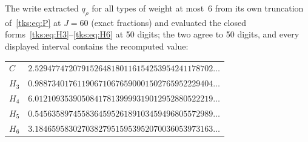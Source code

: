 \begin{writenote}
The write extracted $q_\rho$ for all types of weight at most~6 from its own
truncation of~\eqref{tks:eq:P} at $J=60$ (exact fractions) and evaluated the
closed forms~\eqref{tks:eq:H3}--\eqref{tks:eq:H6} at 50 digits; the two agree
to 50 digits, and every displayed interval contains the recomputed value:
\begin{center}
\begin{tabular}{@{}ll@{}}
$C$ & $2.529477472079152648180116154253954241178702\ldots$\\
$H_3$ & $0.988734017611906710676590001502765952229404\ldots$\\
$H_4$ & $6.012109353905084178139999319012952880522219\ldots$\\
$H_5$ & $0.545635897455836459526189103459496805572989\ldots$\\
$H_6$ & $3.184659583027038279515953952070036053973163\ldots$
\end{tabular}
\end{center}
\end{writenote}
